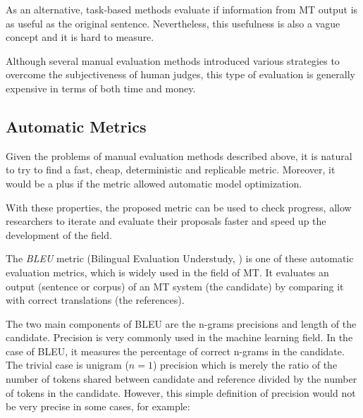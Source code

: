 As an alternative, task-based methods evaluate if information from MT output is as useful as the original sentence.
Nevertheless, this usefulness is also a vague concept and it is hard to measure.


Although several manual evaluation methods introduced various strategies to overcome the subjectiveness of human judges, this type of evaluation is generally expensive in terms of both time and money.


\subsection{Automatic Metrics}
\label{the-eval-auto}

Given the problems of manual evaluation methods described above, it is natural to try to find a fast, cheap, deterministic and replicable metric. Moreover, it would be a plus if the metric allowed automatic model optimization.  

With these properties, the proposed metric can be used to check progress, allow researchers to iterate and evaluate their proposals faster and speed up the development of the field.

The \textit{BLEU} metric (Bilingual Evaluation Understudy, \cite{BLEU}) is one of these automatic evaluation metrics, which is widely used in the field of MT.
It evaluates an output (sentence or corpus) of an MT system (the candidate) by comparing it with correct translations (the references).

The two main components of BLEU are the n-grams precisions and length of the candidate.
Precision is very commonly used in the machine learning field.
In the case of BLEU, it measures the percentage of correct n-grams in the candidate.
The trivial case is unigram ($n=1$) precision which is merely the ratio of the number of tokens shared between candidate and reference divided by the number of tokens in the candidate.
However, this simple definition of precision would not be very precise in some cases, for example:

